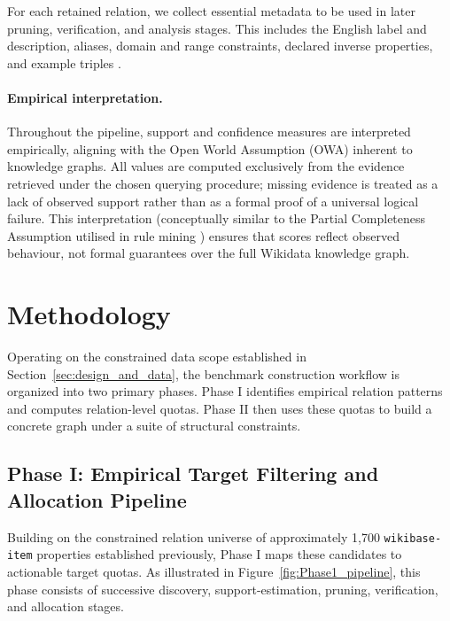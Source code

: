 \documentclass[12pt,a4paper]{article}
\begin{document}
For each retained relation, we collect essential metadata to be used in later pruning, verification, and analysis stages. This includes the English label and description, aliases, domain and range constraints, declared inverse properties, and example triples \cite{wikidata_constraints_portal,wikidata_inverse_constraint}. 

\paragraph{Empirical interpretation.}
Throughout the pipeline, support and confidence measures are interpreted empirically, aligning with the Open World Assumption (OWA) inherent to knowledge graphs. All values are computed exclusively from the evidence retrieved under the chosen querying procedure; missing evidence is treated as a lack of observed support rather than as a formal proof of a universal logical failure. This interpretation (conceptually similar to the Partial Completeness Assumption utilised in rule mining \cite{galarraga2013amie}) ensures that scores reflect observed behaviour, not formal guarantees over the full Wikidata knowledge graph.

\section{Methodology}
\label{sec:methodology}

Operating on the constrained data scope established in Section~\ref{sec:design_and_data}, the benchmark construction workflow is organized into two primary phases. Phase I identifies empirical relation patterns and computes relation-level quotas. Phase II then uses these quotas to build a concrete graph under a suite of structural constraints. 

\subsection{Phase I: Empirical Target Filtering and Allocation Pipeline}

Building on the constrained relation universe of approximately 1,700 \texttt{wikibase-item} properties established previously, Phase I maps these candidates to actionable target quotas. As illustrated in Figure~\ref{fig:Phase1_pipeline}, this phase consists of successive discovery, support-estimation, pruning, verification, and allocation stages.
\end{document}
